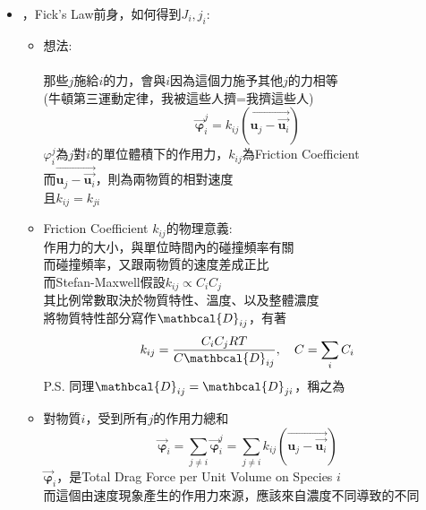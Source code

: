 \documentclass[../main.tex]{subfiles}
\begin{document}
\begin{itemize}
\begin{itemize}
\begin{equation}
    \end{equation}
    $\vec{\bm N}_i=C_i\vec{\bm u}$\\
    P.S. $\sum_i R_i \neq 0$，會跟反應的化學計量有關
  \end{itemize}
  \item {}，Fick's Law前身，如何得到$J_i, j_i$:
  \begin{itemize}
    \item 想法:\\
    \\
    那些$j$施給$i$的力，會與$i$因為這個力施予其他$j$的力相等\\
    (牛頓第三運動定律，我被這些人擠=我擠這些人)
    \begin{equation}
      \vec{\bm \varphi}_i^j= k_{ij} \left(\vec{\bm u_j - \vec{\bm u_i} }\right)
    \end{equation}
    $\varphi_i^j$為$j$對$i$的單位體積下的作用力，$k_{ij}$為Friction Coefficient\\
    而$\vec{\bm u_j - \vec{\bm u_i} }$，則為兩物質的相對速度\\
    且$k_{ij}=k_{ji}$
    \item Friction Coefficient $k_{ij}$的物理意義:\\
    作用力的大小，與單位時間內的碰撞頻率有關\\
    而碰撞頻率，又跟兩物質的速度差成正比\\
    而Stefan-Maxwell假設$\boxed{k_{ij}\propto C_i C_j}$\\
    其比例常數取決於物質特性、溫度、以及整體濃度\\
    將物質特性部分寫作$\mathbcal{D}_{ij}$，有著
    \begin{equation}
      k_{ij} = \frac{C_iC_j RT}{C \mathbcal{D}_{ij}},\quad C=\sum_i C_i
    \end{equation}
    P.S. 同理$\mathbcal{D}_{ij}=\mathbcal{D}_{ji}$，稱之為
    \item 對物質$i$，受到所有$j$的作用力總和
    \begin{equation}
      \vec{\bm \varphi}_i = \sum_{j \neq i} \vec{\bm \varphi}_i^j = \sum_{j \neq i} k_{ij} \left(\vec{\bm u_j - \vec{\bm u_i} }\right)
    \end{equation}
    $\vec{\bm \varphi}_i$，是Total Drag Force per Unit Volume on Species $i$\\
    而這個由速度現象產生的作用力來源，應該來自濃度不同導致的不同

\end{itemize}
\end{itemize}
\end{document}
